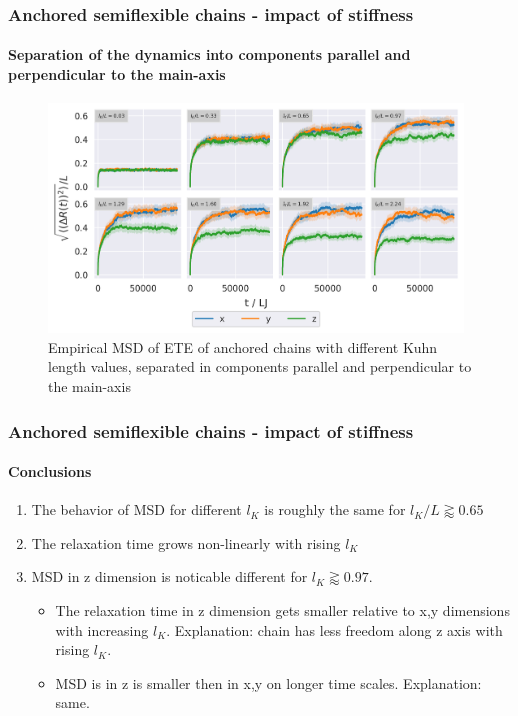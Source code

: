 \documentclass[handout]{beamer}
\begin{document}

\begin{frame}
    \frametitle{Anchored semiflexible chains - impact of stiffness}
    \framesubtitle{Separation of the dynamics into components parallel and perpendicular to the main-axis}

    \begin{figure}[h]
        \includegraphics[width=11cm]{./4-exp-msd_by_dim.png}
        \caption{
            Empirical MSD of ETE of anchored chains with different Kuhn length values,
            separated in components parallel and perpendicular to the main-axis
        }
    \end{figure}
\end{frame}


\begin{frame}
    \frametitle{Anchored semiflexible chains - impact of stiffness}
    \framesubtitle{Conclusions}

    \begin{enumerate}
        \item The behavior of MSD for different $l_K$ is roughly the same for $l_K/L \gtrapprox 0.65$
        \item The relaxation time grows non-linearly with rising $l_K$
        \item MSD in z dimension is noticable different for $l_K \gtrapprox 0.97$. 
        \begin{itemize}
            \item The relaxation time in z dimension gets smaller 
            relative to x,y dimensions with increasing $l_K$. Explanation: chain has less freedom along z axis with rising $l_K$. 
            \item MSD is in z is smaller then in x,y on longer time scales. Explanation: same.
        \end{itemize}
    \end{enumerate}
\end{frame}
\end{document}
